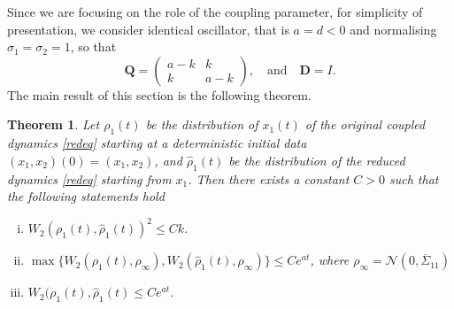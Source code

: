 \documentclass[a4paper,twoside]{article}      %
\newtheorem{theorem}{Theorem}[section]
\theoremstyle{definition}
\begin{document}
Since we are focusing on the role of the coupling parameter, for simplicity of presentation, we consider identical oscillator, that is $a=d<0$ and normalising $\sigma_1=\sigma_2=1$, so that
$$
\mathbf{Q}=\begin{pmatrix}
    a-k&k\\ k&a-k
\end{pmatrix},\quad\text{and}\quad \boldsymbol{D}=I.
$$
The main result of this section is the following theorem.
\begin{theorem} Let $\rho_1(t)$ be the distribution of $x_1(t)$ of the original coupled dynamics \eqref{redeq} starting at a deterministic initial data $(x_1,x_2)(0)=(x_1,x_2)$, and $\hat{\rho}_1(t)$ be the distribution of the reduced dynamics \eqref{redeq} starting from $x_1$. Then there exists a constant $C>0$ such that the following statements hold
   \begin{enumerate}[(i)]
       \item $W_2(\rho_1(t),\hat{\rho}_1(t))^2\leq C k$.
       \item $\max\{W_2(\rho_1(t),\rho_\infty), W_2(\hat{\rho}_1(t),\rho_\infty)\}\leq C e^{at}$, where $\rho_\infty=\mathcal{N}(0,\overline{\Sigma}_{11})$
       \item $W_2(\rho_1(t),\hat{\rho}_1(t)\leq C e^{at}$.
   \end{enumerate}
\end{theorem}
\end{document}
